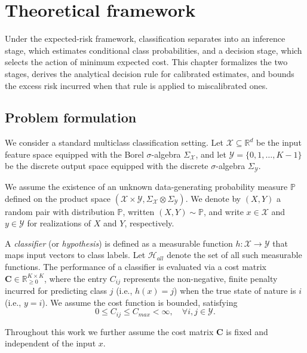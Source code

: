\chapter{Theoretical framework}\label{sec:theory}

Under the expected-risk framework, classification separates into an inference stage, which estimates conditional class probabilities, and a decision stage, which selects the action of minimum expected cost. This chapter formalizes the two stages, derives the analytical decision rule for calibrated estimates, and bounds the excess risk incurred when that rule is applied to miscalibrated ones.

\section{Problem formulation}\label{sec:problem_formulation}

We consider a standard multiclass classification setting. Let $\mathcal{X} \subseteq \mathbb{R}^d$ be the input feature space equipped with the Borel $\sigma$-algebra $\Sigma_{\mathcal{X}}$, and let $\mathcal{Y} = \{0, 1, \dots, K-1\}$ be the discrete output space equipped with the discrete $\sigma$-algebra $\Sigma_{\mathcal{Y}}$.

We assume the existence of an unknown data-generating probability measure $\mathbb{P}$ defined on the product space $(\mathcal{X} \times \mathcal{Y}, \Sigma_{\mathcal{X}} \otimes \Sigma_{\mathcal{Y}})$. We denote by $(X, Y)$ a random pair with distribution $\mathbb{P}$, written $(X, Y) \sim \mathbb{P}$, and write $x \in \mathcal{X}$ and $y \in \mathcal{Y}$ for realizations of $X$ and $Y$, respectively.

A \emph{classifier} (or \emph{hypothesis}) is defined as a measurable function $h: \mathcal{X} \to \mathcal{Y}$ that maps input vectors to class labels. Let $\mathcal{H}_{all}$ denote the set of all such measurable functions. The performance of a classifier is evaluated via a cost matrix $\mathbf{C} \in \mathbb{R}_{\geq 0}^{K \times K}$, where the entry $C_{ij}$ represents the non-negative, finite penalty incurred for predicting class $j$ (i.e., $h(x)=j$) when the true state of nature is $i$ (i.e., $y=i$). We assume the cost function is bounded, satisfying
\begin{equation}
    0 \leq C_{ij} \leq C_{max} < \infty, \quad \forall i,j \in \mathcal{Y}.
\end{equation}

Throughout this work we further assume the cost matrix $\mathbf{C}$ is fixed and independent of the input $x$.


